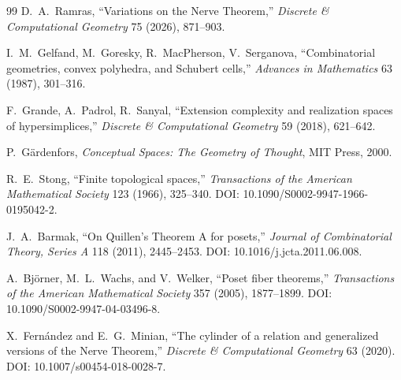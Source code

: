 \documentclass[11pt]{article}
\begin{document}
\begin{thebibliography}{99}
D.~A.~Ramras,
``Variations on the Nerve Theorem,''
\emph{Discrete \& Computational Geometry} 75 (2026), 871--903.

I.~M.~Gelfand, M.~Goresky, R.~MacPherson, V.~Serganova,
``Combinatorial geometries, convex polyhedra, and Schubert cells,''
\emph{Advances in Mathematics} 63 (1987), 301--316.

F.~Grande, A.~Padrol, R.~Sanyal,
``Extension complexity and realization spaces of hyper\-simplices,''
\emph{Discrete \& Computational Geometry} 59 (2018), 621--642.

P.~G\"ardenfors,
\emph{Conceptual Spaces: The Geometry of Thought},
MIT Press, 2000.


R.~E.~Stong,
``Finite topological spaces,''
\emph{Transactions of the American Mathematical Society} 123 (1966), 325--340.
DOI: 10.1090/S0002-9947-1966-0195042-2.

J.~A.~Barmak,
``On Quillen's Theorem A for posets,''
\emph{Journal of Combinatorial Theory, Series A} 118 (2011), 2445--2453.
DOI: 10.1016/j.jcta.2011.06.008.

A.~Bj\"orner, M.~L.~Wachs, and V.~Welker,
``Poset fiber theorems,''
\emph{Transactions of the American Mathematical Society} 357 (2005), 1877--1899.
DOI: 10.1090/S0002-9947-04-03496-8.

X.~Fern\'andez and E.~G.~Minian,
``The cylinder of a relation and generalized versions of the Nerve Theorem,''
\emph{Discrete \& Computational Geometry} 63 (2020).
DOI: 10.1007/s00454-018-0028-7.

\end{thebibliography}
\end{document}
